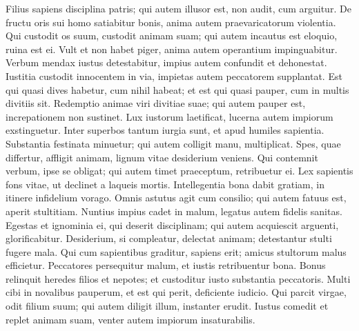 \begin{biblechapter}
\begin{biblechapter}
\begin{biblechapter}
\begin{biblechapter}
\begin{biblechapter}
\begin{biblechapter}
\begin{biblechapter}
\begin{biblechapter}
\begin{biblechapter}
\begin{biblechapter}
\begin{biblechapter}
\begin{biblechapter}
\begin{biblechapter}
 \verse Filius sapiens disciplina patris;
 qui autem illusor est, non audit, cum arguitur.
 \verse De fructu oris sui homo satiabitur bonis,
 anima autem praevaricatorum violentia.
 \verse Qui custodit os suum, custodit animam suam;
 qui autem incautus est eloquio, ruina est ei.
 \verse Vult et non habet piger,
 anima autem operantium impinguabitur.
 \verse Verbum mendax iustus detestabitur,
 impius autem confundit et dehonestat.
 \verse Iustitia custodit innocentem in via,
 impietas autem peccatorem supplantat.
 \verse Est qui quasi dives habetur, cum nihil habeat;
 et est qui quasi pauper, cum in multis divitiis sit.
 \verse Redemptio animae viri divitiae suae;
 qui autem pauper est, increpationem non sustinet.
 \verse Lux iustorum laetificat,
 lucerna autem impiorum exstinguetur.
 \verse Inter superbos tantum iurgia sunt,
 et apud humiles sapientia.
 \verse Substantia festinata minuetur;
 qui autem colligit manu, multiplicat.
 \verse Spes, quae differtur, affligit animam,
 lignum vitae desiderium veniens.
 \verse Qui contemnit verbum, ipse se obligat;
 qui autem timet praeceptum, retribuetur ei.
 \verse Lex sapientis fons vitae,
 ut declinet a laqueis mortis.
 \verse Intellegentia bona dabit gratiam,
 in itinere infidelium vorago.
 \verse Omnis astutus agit cum consilio;
 qui autem fatuus est, aperit stultitiam.
 \verse Nuntius impius cadet in malum,
 legatus autem fidelis sanitas.
 \verse Egestas et ignominia ei, qui deserit disciplinam;
 qui autem acquiescit arguenti, glorificabitur.
 \verse Desiderium, si compleatur, delectat animam;
 detestantur stulti fugere mala.
 \verse Qui cum sapientibus graditur, sapiens erit;
 amicus stultorum malus efficietur.
 \verse Peccatores persequitur malum,
 et iustis retribuentur bona.
 \verse Bonus relinquit heredes filios et nepotes;
 et custoditur iusto substantia peccatoris.
 \verse Multi cibi in novalibus pauperum,
 et est qui perit, deficiente iudicio.
 \verse Qui parcit virgae, odit filium suum;
 qui autem diligit illum, instanter erudit.
 \verse Iustus comedit et replet animam suam,
 venter autem impiorum insaturabilis.
 

\end{biblechapter}
\end{biblechapter}
\end{biblechapter}
\end{biblechapter}
\end{biblechapter}
\end{biblechapter}
\end{biblechapter}
\end{biblechapter}
\end{biblechapter}
\end{biblechapter}
\end{biblechapter}
\end{biblechapter}
\end{biblechapter}

